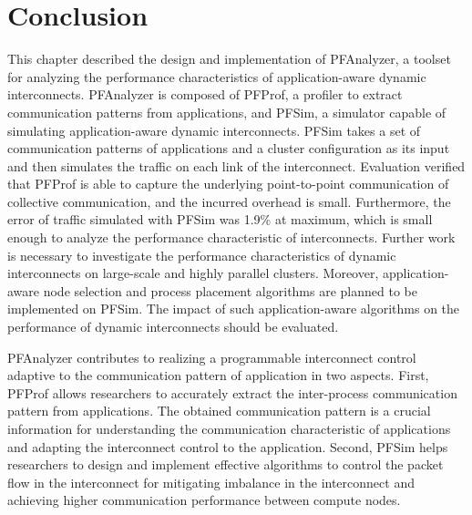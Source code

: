 \section{Conclusion}\label{sec:ii-conclusion}

This chapter described the design and implementation of PFAnalyzer, a
toolset for analyzing the performance characteristics of
application-aware dynamic interconnects. PFAnalyzer is composed of
PFProf, a profiler to extract communication patterns from applications,
and PFSim, a simulator capable of simulating application-aware dynamic
interconnects. PFSim takes a set of communication patterns of
applications and a cluster configuration as its input and then simulates
the traffic on each link of the interconnect. Evaluation verified that PFProf
is able to capture the underlying point-to-point communication of collective
communication, and the incurred overhead is small. Furthermore, the error
of traffic simulated with PFSim was 1.9\% at maximum, which is small enough to
analyze the performance characteristic of interconnects. Further work is
necessary to investigate the performance characteristics of dynamic
interconnects on large-scale and highly parallel clusters. Moreover,
application-aware node selection and process placement algorithms are planned
to be implemented on PFSim. The impact of such application-aware algorithms on
the performance of dynamic interconnects should be evaluated.

PFAnalyzer contributes to realizing a programmable interconnect control
adaptive to the communication pattern of application in two aspects. First,
PFProf allows researchers to accurately extract the inter-process
communication pattern from applications. The obtained communication pattern is
a crucial information for understanding the communication characteristic of
applications and adapting the interconnect control to the application. Second,
PFSim helps researchers to design and implement effective algorithms to
control the packet flow in the interconnect for mitigating imbalance in the
interconnect and achieving higher communication performance between compute
nodes.
